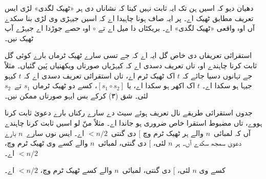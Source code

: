 \documentclass[../../../include/open-logic-section]{subfiles}
\begin{document}
دھیان دیو کہ اسیں ہن تک ایہ ثابت نہیں کیتا کہ نشاناں دی ہر «ٹھیک لگدی» لڑی ایس تعریف مطابق ٹھیک اے۔ پر ایہ صاف ہونا چاہیدا اے کہ اسیں جیہڑی وی لڑی بنا سکدے آں اوہ واقعی «ٹھیک لگدی» اے۔ بریکٹاں دا میل اے تے $\circ$ اوہ حصے جوڑدا اے جیہڑے آپ ٹھیک نیں۔

استقرائی تعریفاں دی خاص گل ایہ اے کہ جے تسی سارے ٹھیک ٹرماں بارے کوئی گل ثابت کرنا چاہندے او، تاں تعریف دسدی اے کہ کیہڑیاں صورتاں ویکھنیاں پَین گئیاں۔ مثلاً جے تہانوں دسیا جائے کہ $t$ اک ٹھیک ٹرم اے، تاں استقرائی تعریف دسدی اے کہ $t$ کیہو جیہا ہو سکدا اے۔ $t$ اک اکھر ہو سکدا اے، یا $[s_1 \circ s_2]$، کسے دو ٹھیک ٹرماں $s_1$ تے~$s_2$ لئی۔ شق (۳) کرکے بس ایہو صورتاں ممکن نیں۔

جدوں استقرائی طریقے نال تعریف ہوئے سیٹ دے سارے رکناں بارے دعویٰ ثابت کرنا ہووے، تاں مضبوط استقرا خاص ضروری ہو جاندا اے۔ مثلاً منّ لو اسیں ثابت کرنا چاہندے آں کہ لمبائی~$n$ والے ہر ٹھیک ٹرم وچ $[$ دی گنتی~$< n/2$ اے۔ ایس نوں سارے~$n$ بارے دعویٰ سمجھ سکدے آں۔ ہر $n$ لئی، $[$ دی گنتی، لمبائی~$n$ والے کسے وی ٹھیک ٹرم وچ، $< n/2$ اے۔

\begin{prop}
  کسے وی $n$ لئی، $[$ دی گنتی، لمبائی~$n$ والے کسے ٹھیک ٹرم وچ، $< n/2$ اے۔
\end{prop}
\end{document}

